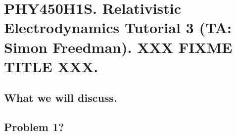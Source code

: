 
%

\chapter{PHY450H1S.  Relativistic Electrodynamics Tutorial 3 (TA: Simon Freedman).  XXX FIXME TITLE XXX.}
\label{chap:relativisticElectrodynamicsT3}
{}
\date{Feb 4, 2011}

\beginArtWithToc

\section{What we will discuss.}

\section{Problem 1?}

\EndNoBibArticle
